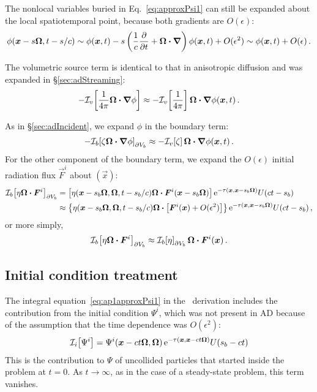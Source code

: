 The nonlocal variables buried in Eq.~\eqref{eq:approxPsi1} can still be expanded
about the local spatiotemporal point, because both gradients are $O(\epsilon)$:
\begin{equation} \label{eq:ap1taylorPhi}
  \phi(\bm{x} - s \bm{\Omega}, t-s/c)
  \sim \phi(\bm{x},t) - s \left( \frac{1}{c} \frac{\partial }{\partial t} + \bm{\Omega} \bm{\cdot}
  \bm{\nabla}  \right) \phi (\bm{x}, t) + O(\epsilon^2) \sim \phi(\bm{x},t) +
  O(\epsilon) \,.
\end{equation}

The volumetric source term is identical to that in anisotropic diffusion and was
expanded in \S\ref{sec:adStreaming}:
\begin{equation*}
  - \mathcal{I}_{v}\!\left[\frac{1}{4\pi} \bm{\Omega}\bm{\cdot} \bm{\nabla} \phi\right]
  \approx  - \mathcal{I}_{v}\!\left[\frac{1}{4\pi}\right] \bm{\Omega}\bm{\cdot} \bm{\nabla}
  \phi(\bm{x},t) \,.
\end{equation*}

As in \S\ref{sec:adIncident}, we expand $\phi$ in the boundary term:
\begin{equation*}
-\mathcal{I}_{b}\!\left[\zeta \bm{\Omega}\bm{\cdot} \bm{\nabla} \phi\right]_{\partial V_b}
  \approx  - \mathcal{I}_{v}\!\left[\zeta\right] \bm{\Omega}\bm{\cdot} \bm{\nabla}
  \phi(\bm{x},t) \,.
\end{equation*}
For the other component of the boundary term, we expand the $O(\epsilon)$
initial radiation flux $\vec{F}^i$ about $(\vec{x})$:
\begin{align*} \nonumber
\mathcal{I}_{b}\!\left[\eta \bm{\Omega}\bm{\cdot} \bm{F}^i\right]_{\partial V_b}
&= \left[\eta(\bm{x} - s_b\bm{\Omega}, \bm{\Omega}, t - s_b/c)
    \bm{\Omega}\bm{\cdot} \bm{F}^i(\bm{x} - s_b\bm{\Omega}) \right]
    \mathop{}\!\mathrm{e}^{ -\tau(\bm{x}, \bm{x} - s_b \bm{\Omega})} U(ct - s_b)
    \\
&\approx \left\{\eta(\bm{x} - s_b\bm{\Omega}, \bm{\Omega}, t - s_b/c)
\bm{\Omega}\bm{\cdot} \left[
\bm{F}^i(\bm{x}) + O(\epsilon^2)\right] \right\}
  \mathop{}\!\mathrm{e}^{ -\tau(\bm{x}, \bm{x} - s_b \bm{\Omega})} U(ct - s_b)\,,
\end{align*}
or more simply,
\begin{equation*}
\mathcal{I}_{b}\!\left[\eta \bm{\Omega}\bm{\cdot} \bm{F}^i\right]_{\partial V_b}
  \approx \mathcal{I}_{b}\!\left[\eta\right]_{\partial V_b}
  \bm{\Omega}\bm{\cdot} \bm{F}^i(\bm{x}) \,.
\end{equation*}

\subsection{Initial condition treatment}
The integral equation~\eqref{eq:ap1approxPsi1} in the \APone\ derivation
includes the contribution from the initial condition $\Psi^i$, which was not
present in AD because of the assumption that the time dependence was
$O(\epsilon^2)$:
\begin{equation*}
  \mathcal{I}_{i}\!\left[\Psi^i\right] = \Psi^i( \bm{x} - ct \bm{\Omega}, \bm{\Omega})
    \mathop{}\!\mathrm{e}^{ -\tau(\bm{x}, \bm{x} - ct \bm{\Omega})} U( s_b - ct)
\end{equation*}
This is the contribution to $\Psi$ of uncollided particles that started
inside the problem at $t=0$. As $t\to\infty$, as in the case of a steady-state
problem, this term vanishes.


